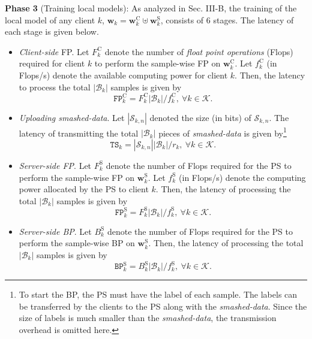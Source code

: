 \documentclass[10pt,journal,transmag]{IEEEtran}
\begin{document}
\textbf{Phase 3} (Training local models): As analyzed in Sec. III-B, the training of the local model of any client $k$, $\textbf{w}_k=\textbf{w}^\text{C}_k \uplus \textbf{w}^\text{S}_k$, consists of 6 stages. The latency of each stage is given below. 
\begin{itemize}
    \item[(1)] \textit{Client-side} FP. Let $F^\text{C}_k$ denote the number of \textit{float point operations} (Flops) required for client $k$ to perform the sample-wise FP on $\textbf{w}^\text{C}_k$. Let $f_k^\text{C}$ (in Flops/s) denote the available computing power for client $k$. Then, the latency to process the total $|\mathcal{B}_k|$ samples is given by
    \begin{equation}
        \texttt{FP}_k^\text{C} = F^\text{C}_k |\mathcal{B}_k| / {f_k^\text{C}},\ \forall k \in \mathcal{K}. 
    \end{equation}

    \item[(2)] \textit{Uploading smashed-data}. Let $|\mathcal{S}_{k,n}|$ denoted the size (in bits) of $\mathcal{S}_{k,n}$. The latency of transmitting the total $|\mathcal{B}_k|$ pieces of \textit{smashed-data} is given by\footnote{To start the BP, the PS must have the label of each sample. The labels can be transferred by the clients to the PS along with the \textit{smashed-data}. Since the size of labels is much smaller than the \textit{smashed-data}, the transmission overhead is omitted here.}
    \begin{equation}
        \texttt{TS}_k = |\mathcal{S}_{k,n}| |\mathcal{B}_k| / r_k,\  \forall k \in \mathcal{K}.
    \end{equation}
       
    \item[(3)] \textit{Server-side FP}. Let $F^\text{S}_k$ denote the number of Flops required for the PS to perform the sample-wise FP on $\textbf{w}^\text{S}_k$. Let $f_k^\text{S}$ (in Flops/s) denote the computing power allocated by the PS to client $k$. Then, the latency of processing the total $|\mathcal{B}_k|$ samples is given by
    \begin{equation}
        \texttt{FP}_k^\text{S} = F^\text{S}_k |\mathcal{B}_k| / f_k^\text{S},\ \forall k \in \mathcal{K}.
    \end{equation}
    
    \item[(4)] \textit{Server-side BP}. Let $B^\text{S}_k$ denote the number of Flops required for the PS to perform the sample-wise BP on $\textbf{w}^\text{S}_k$. Then, the latency of processing the total $|\mathcal{B}_k|$ samples is given by
    \begin{equation}
        \texttt{BP}_k^\text{S} = B^\text{S}_k |\mathcal{B}_k| / f_k^\text{S},\ \forall k \in \mathcal{K}. 
    \end{equation}


\end{itemize}
\end{document}
